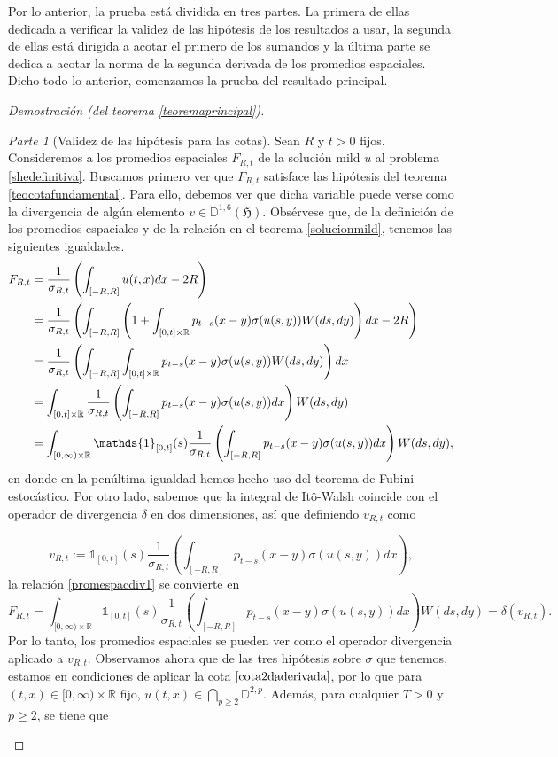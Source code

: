 \documentclass[letterpaper,twoside,12pt]{book}
\newcommand{\R}{\mathbb{R}}
\newcommand{\D}{\mathbb{D}}
\newcommand{\1}{\mathds{1}}
\theoremstyle{definition}
\theoremstyle{definition}
\theoremstyle{remark}
\newtheorem{proofpart}{Parte}
\theoremstyle{definition}
\theoremstyle{definition}
\theoremstyle{definition}
\theoremstyle{definition}
\theoremstyle{definition}
\begin{document}
Por lo anterior, la prueba está dividida en tres partes. La primera de ellas dedicada a verificar la validez de las hipótesis de los resultados a usar, la segunda de ellas está dirigida a acotar el primero de los sumandos y la última parte se dedica a acotar la norma de la segunda derivada de los promedios espaciales. Dicho todo lo anterior, comenzamos la prueba del resultado principal.
\begin{proof}[Demostración (del teorema \ref{teoremaprincipal})]

\begin{proofpart}[Validez de las hipótesis para las cotas]
Sean $R$ y $t>0$ fijos. Consideremos a los promedios espaciales $F_{R,t}$ de la solución mild $u$ al problema \eqref{shedefinitiva}. Buscamos primero ver que $F_{R,t}$ satisface las hipótesis del teorema \ref{teocotafundamental}. Para ello, debemos ver que dicha variable puede verse como la divergencia de algún elemento $v\in \D^{1,6}(\mathfrak{H})$. Obsérvese que, de la definición de los promedios espaciales y de la relación en el teorema \ref{solucionmild}, tenemos las siguientes igualdades.
\begin{align}
   F_{R,t}&=\frac{1}{\sigma_{R,t}}\left(\int_{[-R,R]}u(t,x)dx-2R\right)\notag\\
   &=\frac{1}{\sigma_{R,t}}\left(\int_{[-R,R]}\left(1+\int_{[0,t]\times \R}p_{t-s}(x-y)\sigma(u(s,y))W(ds,dy)\right)dx-2R\right)\notag\\
   &=\frac{1}{\sigma_{R,t}}\left(\int_{[-R,R]}\int_{[0,t]\times \R}p_{t-s}(x-y)\sigma(u(s,y))W(ds,dy)\right)dx\notag\\
   &=\int_{[0,t]\times \R}\frac{1}{\sigma_{R,t}}\left(\int_{[-R,R]}p_{t-s}(x-y)\sigma(u(s,y))dx\right)W(ds,dy)\notag\\
   &=\int_{[0,\infty)\times \R}\1_{[0,t]}(s)\frac{1}{\sigma_{R,t}}\left(\int_{[-R,R]}p_{t-s}(x-y)\sigma(u(s,y))dx\right)W(ds,dy)\label{promespacdiv1},
\end{align}
en donde en la penúltima igualdad hemos hecho uso del teorema de Fubini estocástico. Por otro lado, sabemos que la integral de Itô-Walsh coincide con el operador de divergencia $\delta$ en dos dimensiones, así que definiendo $v_{R,t}$ como 

\begin{equation}\label{vectordireccion}
      v_{R,t}:=\1_{[0,t]}(s)\frac{1}{\sigma_{R,t}}\left(\int_{[-R,R]}p_{t-s}(x-y)\sigma(u(s,y))dx\right),
\end{equation}
 la relación \eqref{promespacdiv1} se convierte en
\begin{equation}\label{promespacialdiv2}
F_{R,t}=\int_{[0,\infty)\times \R}\1_{[0,t]}(s)\frac{1}{\sigma_{R,t}}\left(\int_{[-R,R]}p_{t-s}(x-y)\sigma(u(s,y))dx\right)W(ds,dy)=\delta(v_{R,t}).
\end{equation}
Por lo tanto, los promedios espaciales se pueden ver como el operador divergencia aplicado a $v_{R,t}$. Observamos ahora que de las tres hipótesis sobre $\sigma$ que tenemos, estamos en condiciones de aplicar la cota $\eqref{cota2daderivada}$, por lo que para $(t,x)\in [0,\infty)\times\R$ fijo, $u(t,x)\in \bigcap_{p\geq2} \D^{2,p}$. Además, para cualquier $T>0$ y $p\geq2$, se tiene que 


\end{proofpart}
\end{proof}
\end{document}
